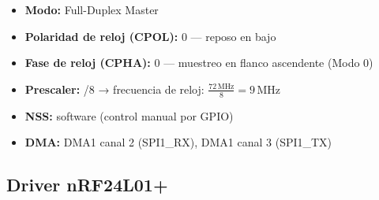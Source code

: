 \documentclass[12pt,a4paper]{article}
\begin{document}
  \begin{itemize}                                                                                                                                                                                                                                             
      \item \textbf{Modo:} Full-Duplex Master
      \item \textbf{Polaridad de reloj (CPOL):} 0 — reposo en bajo                                                                                                                                                                                            
      \item \textbf{Fase de reloj (CPHA):} 0 — muestreo en flanco ascendente (Modo 0)                                                                                                                                                                         
      \item \textbf{Prescaler:} /8 → frecuencia de reloj: $\frac{72\,\text{MHz}}{8} = 9\,\text{MHz}$                                                                                                                                                          
      \item \textbf{NSS:} software (control manual por GPIO)                                                                                                                                                                                                  
      \item \textbf{DMA:} DMA1 canal 2 (SPI1\_RX), DMA1 canal 3 (SPI1\_TX)                                                                                                                                                                                    
  \end{itemize}                                                                                                                                                                                                                                               
                                                                                                                                                                                                                                                              
  \subsection{Driver nRF24L01+}                                                                                                                                                                                                                               
\end{document}
